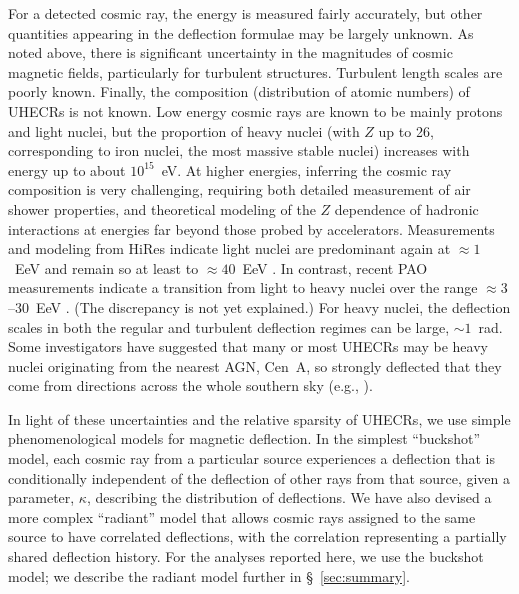 For a detected cosmic ray, the energy is measured fairly accurately, but
other quantities appearing in the deflection formulae may be largely
unknown.  As noted above, there is significant uncertainty in the magnitudes
of cosmic magnetic fields, particularly for turbulent structures.  Turbulent
length scales are poorly known.  Finally, the composition (distribution of
atomic numbers) of UHECRs is not known.  Low energy cosmic rays are known to
be mainly protons and light nuclei, but the proportion of heavy nuclei (with
$Z$ up to 26, corresponding to iron nuclei, the most massive stable nuclei)
increases with energy up to about $10^{15}$~eV.  At higher energies,
inferring the cosmic ray composition is very challenging, requiring both
detailed measurement of air shower properties, and theoretical modeling
of the $Z$ dependence of hadronic interactions at energies far beyond
those probed by accelerators.  Measurements and modeling from HiRes
indicate light nuclei are predominant again at $\approx 1$~EeV and remain
so at least to $\approx 40$~EeV \cite{HiRes10-Final-arxiv}.
In contrast, recent PAO measurements indicate a transition from light
to heavy nuclei over the range $\approx 3$--30~EeV
\cite{PAO10-Composition,PAO12-Composition}.
(The discrepancy is not yet explained.)
For heavy nuclei, the deflection scales in both the regular and
turbulent deflection regimes can be large, $\sim 1$~rad. Some
investigators have suggested that many or most UHECRs may be heavy
nuclei originating from the nearest AGN, Cen~A, so strongly deflected
that they come from directions across the whole southern sky (e.g.,
\cite{B+09-CenA,GBdS10-CenA,BdS12-CenA}).




In light of these uncertainties and the relative sparsity of UHECRs,
we use simple phenomenological models for magnetic deflection.  
In the simplest ``buckshot'' model, each cosmic ray from a particular source
experiences a deflection that is conditionally independent of the deflection
of other rays from that source, given a parameter, $\kappa$, describing the
distribution of deflections.  We have also devised a more
complex ``radiant'' model that allows cosmic rays assigned to the same
source to have correlated deflections, with the correlation representing
a partially shared deflection history.  For the analyses reported here, we
use the buckshot model; we describe the radiant model further in
\S~\ref{sec:summary}.

